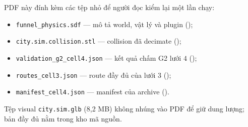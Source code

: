 PDF này đính kèm các tệp nhỏ để người đọc kiểm lại một lần chạy:
\begin{itemize}\setlength{\itemsep}{1pt}
  \item \texttt{funnel\_physics.sdf} --- mô tả world, vật lý và plugin
    ();
  \item \texttt{city.sim.collision.stl} --- collision đã decimate
    ();
  \item \texttt{validation\_g2\_cell4.json} --- kết quả chấm G2 lưới $4$
    ();
  \item \texttt{routes\_cell3.json} --- route đầy đủ của lưới $3$
    ();
  \item \texttt{manifest\_cell4.json} --- manifest của archive
    ().
\end{itemize}
Tệp visual \texttt{city.sim.glb} (8,2 MB) không nhúng vào PDF để giữ dung lượng;
bản đầy đủ nằm trong kho mã nguồn.
